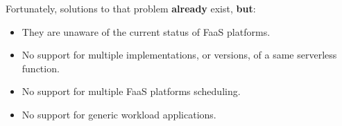 \documentclass[13.5pt]{beamer}
\begin{document}

\begin{frame}
	
	Fortunately, solutions to that problem \textbf{already} exist, \textbf{but}:
	\vspace{\baselineskip}
	\begin{itemize}
		\item They are unaware of the current status of FaaS platforms.
		\item No support for multiple implementations, or versions, of a same serverless function.
		\item No support for multiple FaaS platforms scheduling.
		\item No support for generic workload applications.
	\end{itemize}
	
\end{frame} 

\end{document}
